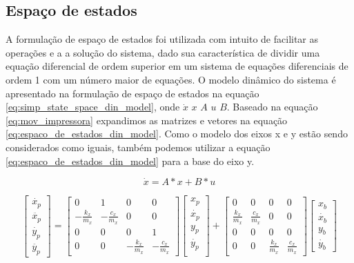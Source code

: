 \subsection{Espaço de estados}
A formulação de espaço de estados foi utilizada com intuito de facilitar as operações e
a a solução do sistema, dado sua característica de dividir uma equação diferencial
de ordem superior em um sistema de equações diferenciais de ordem 1 com um número maior de equações.
O modelo dinâmico do sistema é apresentado na formulação de espaço de estados 
na equação \ref{eq:simp_state_space_din_model}, onde $\dot x$ $x$ $A$ $u$ $B$.
Baseado na equação \ref{eq:mov_impressora} expandimos as matrizes e vetores na equação 
\ref{eq:espaco_de_estados_din_model}.
Como o modelo dos eixos x e y estão sendo considerados como iguais, também podemos utilizar a equação 
\ref{eq:espaco_de_estados_din_model} para a base do eixo y.

\begin{equation}
    \label{eq:simp_state_space_din_model}
    \dot x = A*x+B*u
\end{equation}

\begin{equation}
    \label{eq:espaco_de_estados_din_model}
    \begin{bmatrix}
        \dot{x_p} \\
        \ddot{x_p} \\
        \dot{y_p} \\
        \ddot{y_p}
    \end{bmatrix}
    =
    \begin{bmatrix}
        0 & 1 & 0 & 0 \\
        -\frac{k_x}{m_x} & -\frac{c_x}{m_x} & 0 & 0 \\
        0 & 0 & 0 & 1 \\
        0 & 0 & -\frac{k_x}{m_x} & -\frac{c_x}{m_x}
    \end{bmatrix}
    \begin{bmatrix}
        x_p \\
        \dot{x_p} \\        
        y_p \\
        \dot{y_p} \\
    \end{bmatrix}
    +
    \begin{bmatrix}
        0 & 0 & 0 & 0 \\
        \frac{k_x}{m_x} & \frac{c_x}{m_x} & 0 & 0 \\
        0 & 0 & 0 & 0 \\
        0 & 0 & \frac{k_x}{m_x} & \frac{c_x}{m_x}
    \end{bmatrix}
    \begin{bmatrix}
        x_b \\
        \dot{x_b}  \\
        y_b \\
        \dot{y_b} 
    \end{bmatrix}
\end{equation}

